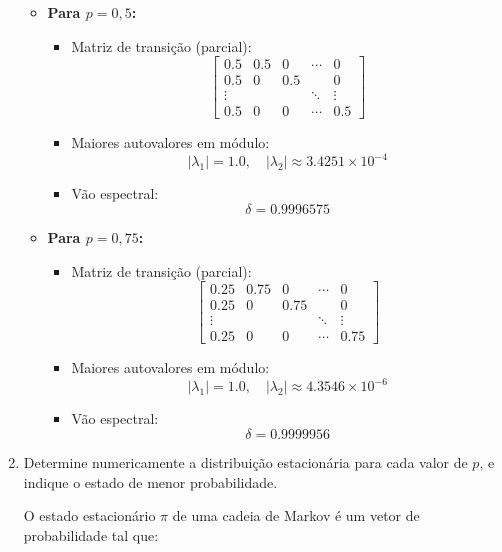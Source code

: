 \begin{enumerate}
\begin{resposta}
\begin{itemize}
            \item \textbf{Para $p = 0{,}5$:}
            \begin{itemize}
                \item Matriz de transição (parcial):
                $$
                \begin{bmatrix}
                0.5 & 0.5 & 0    & \cdots & 0 \\
                0.5 & 0   & 0.5  &        & 0 \\
                \vdots &     &     & \ddots & \vdots \\
                0.5 & 0   & 0    & \cdots & 0.5
                \end{bmatrix}
                $$
                \item Maiores autovalores em módulo:
                $$ |\lambda_1| = 1.0, \quad |\lambda_2| \approx 3.4251 \times 10^{-4} $$
                \item Vão espectral:
                $$ \boxed{\delta = 0.9996575} $$
            \end{itemize}
        
            \item \textbf{Para $p = 0{,}75$:}
            \begin{itemize}
                \item Matriz de transição (parcial):
                $$
                \begin{bmatrix}
                0.25 & 0.75 & 0    & \cdots & 0 \\
                0.25 & 0    & 0.75 &        & 0 \\
                \vdots &     &     & \ddots & \vdots \\
                0.25 & 0    & 0    & \cdots & 0.75
                \end{bmatrix}
                $$
                \item Maiores autovalores em módulo:
                $$ |\lambda_1| = 1.0, \quad |\lambda_2| \approx 4.3546 \times 10^{-6} $$
                \item Vão espectral:
                $$ \boxed{\delta = 0.9999956} $$
            \end{itemize}
        \end{itemize}
        


    \end{resposta}
    \item Determine numericamente a distribuição estacionária para cada valor de $p$, e indique o estado de menor probabilidade.
    \begin{resposta}
        O estado estacionário $\pi$ de uma cadeia de Markov é um vetor de probabilidade tal que:


\end{resposta}
\end{enumerate}
